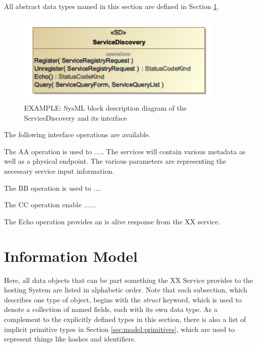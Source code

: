 \documentclass[a4paper]{arrowhead}
\begin{document}
All abstract data types named in this section are defined in Section \ref{sec:model}.
\color{black}

\begin{figure}[h!]
  \centering
  \includegraphics[width=10cm]{figures/ServiceDiscovery_SD}
  \caption{\color{red} EXAMPLE: SysML block description diagram of the ServiceDiscovery and
    its interface \color{black}}
  \label{fig:SD}
\end{figure}

The following interface operations are available.


\color{red} 
The AA operation is used to ..... The services will contain various
metadata as well as a physical endpoint. The various parameters are
representing the necessary service input information.
\color{black}


\color{red} 
The BB operation is used to .... 
\color{black}


\color{red} 
The CC operation enable ......
\color{black}


\color{red} 
The Echo operation provides an is alive response from the XX service.
\color{black}

\newpage

\section{Information Model}
\label{sec:model}

\color{red} 
Here, all data objects that can be part something the XX Service
provides to the hosting System are listed in alphabetic order.
Note that each subsection, which describes one type of object, begins with the \textit{struct} keyword, which is used to denote a collection of named fields, each with its own data type.
As a complement to the explicitly defined types in this section, there is also a list of implicit primitive types in Section \ref{sec:model:primitives}, which are used to represent things like hashes and identifiers.
\end{document}
